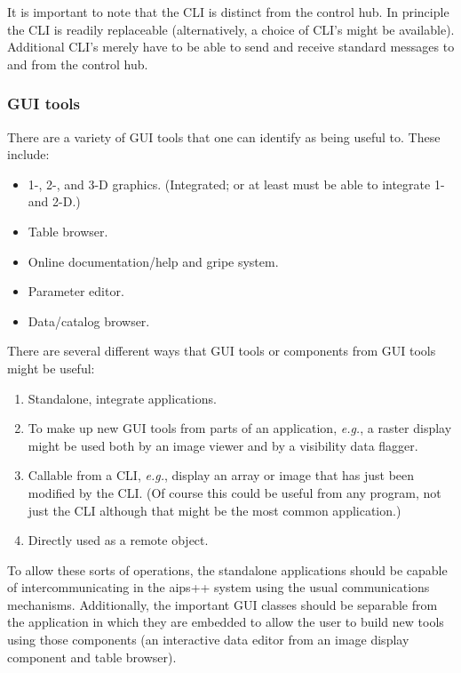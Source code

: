 It is important to note that the CLI is distinct from the control
hub. In principle the CLI is readily replaceable (alternatively, a
choice of CLI's might be available). Additional CLI's merely have to
be able to send and receive standard messages to and from the control
hub.

\subsubsection{GUI tools}
There are a variety of GUI tools that one can identify as being useful
to. These include:
\begin{itemize}
        \item 1-, 2-, and 3-D graphics. (Integrated; or at least must
        be able to integrate 1- and 2-D.)
        \item Table browser.
        \item Online documentation/help and gripe system.
        \item Parameter editor.
        \item Data/catalog browser.
\end{itemize}

There are several different ways that GUI tools or components from GUI
tools might be useful:
\begin{enumerate}
        \item Standalone, integrate applications.
        \item To make up new GUI tools from parts of an application,
                {\em e.g.}, a raster display might be used both by an image
                viewer and by a visibility data flagger.
        \item Callable from a CLI, {\em e.g.}, display an array or image that
              has just been modified by the CLI. (Of course this could
              be useful from any program, not just the CLI although that
              might be the most common application.)
        \item Directly used as a remote object.
\end{enumerate}
To allow these sorts of operations, the standalone applications should
be capable of intercommunicating in the {\sc aips++} system using the
usual communications mechanisms. Additionally, the important GUI
classes should be separable from the application in which they are
embedded to allow the user to build new tools using those components
(an interactive data editor from an image display component and table
browser).

